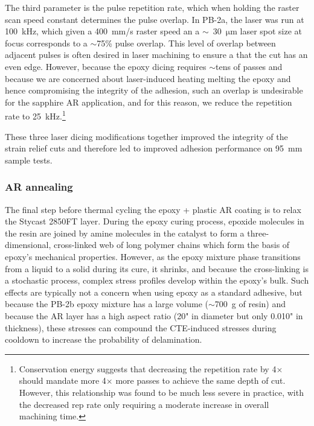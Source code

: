 The third parameter is the pulse repetition rate, which when holding the raster scan speed constant determines the pulse overlap. In PB-2a, the laser was run at 100~kHz, which given a 400~mm/s raster speed an a $\sim$~30~$\mathrm{\mu m}$ laser spot size at focus corresponds to a $\sim$75\% pulse overlap. This level of overlap between adjacent pulses is often desired in laser machining to ensure a that the cut has an even edge. However, because the epoxy dicing requires $\sim$tens of passes and because we are concerned about laser-induced heating melting the epoxy and hence compromising the integrity of the adhesion, such an overlap is undesirable for the sapphire AR application, and for this reason, we reduce the repetition rate to 25~kHz.\footnote{Conservation energy suggests that decreasing the repetition rate by 4$\times$ should mandate more 4$\times$ more passes to achieve the same depth of cut. However, this relationship was found to be much less severe in practice, with the decreased rep rate only requiring a moderate increase in overall machining time.}

These three laser dicing modifications together improved the integrity of the strain relief cuts and therefore led to improved adhesion performance on 95~mm sample tests.


\subsubsection{AR annealing}
\label{sec:sapphire_ar_coating_epoxy_plastic_fabrication_5880LZ_annealing}

The final step before thermal cycling the epoxy + plastic AR coating is to relax the Stycast 2850FT layer. During the epoxy curing process, epoxide molecules in the resin are joined by amine molecules in the catalyst to form a three-dimensional, cross-linked web of long polymer chains which form the basis of epoxy's mechanical properties. However, as the epoxy mixture phase transitions from a liquid to a solid during its cure, it shrinks, and because the cross-linking is a stochastic process, complex stress profiles develop within the epoxy's bulk. Such effects are typically not a concern when using epoxy as a standard adhesive, but because the PB-2b epoxy mixture has a large volume ($\sim$700~g of resin) and because the AR layer has a high aspect ratio (20" in diameter but only 0.010" in thickness), these stresses can compound the CTE-induced stresses during cooldown to increase the probability of delamination.

